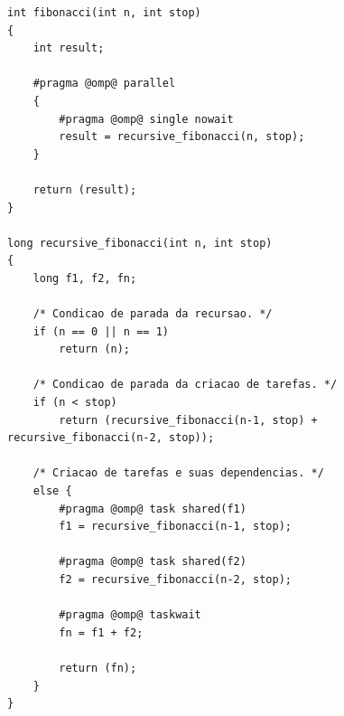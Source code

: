 \documentclass{SBCbookchapter}
\begin{document}
\begin{lstlisting}[frame=single,
caption=Implementação recursiva da sequência de Fibonacci., label=listing:fibonacci]
int fibonacci(int n, int stop)
{
	int result;
	
	#pragma @omp@ parallel
  	{
		#pragma @omp@ single nowait
		result = recursive_fibonacci(n, stop);
	}
		
	return (result);
}

long recursive_fibonacci(int n, int stop)
{
	long f1, f2, fn;

	/* Condicao de parada da recursao. */
	if (n == 0 || n == 1) 
		return (n);

	/* Condicao de parada da criacao de tarefas. */
	if (n < stop) 
		return (recursive_fibonacci(n-1, stop) + recursive_fibonacci(n-2, stop));
	
	/* Criacao de tarefas e suas dependencias. */
	else {
		#pragma @omp@ task shared(f1)
		f1 = recursive_fibonacci(n-1, stop);

		#pragma @omp@ task shared(f2)
		f2 = recursive_fibonacci(n-2, stop);
		
		#pragma @omp@ taskwait
		fn = f1 + f2;
			
		return (fn);
	}
}
\end{lstlisting}
	
\end{document}
